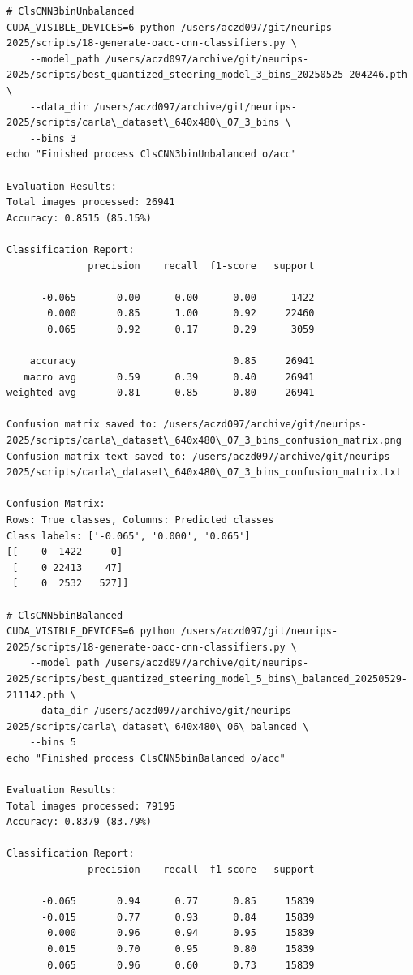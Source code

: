 \begin{verbatim}
# ClsCNN3binUnbalanced
CUDA_VISIBLE_DEVICES=6 python /users/aczd097/git/neurips-2025/scripts/18-generate-oacc-cnn-classifiers.py \
    --model_path /users/aczd097/archive/git/neurips-2025/scripts/best_quantized_steering_model_3_bins_20250525-204246.pth \
    --data_dir /users/aczd097/archive/git/neurips-2025/scripts/carla\_dataset\_640x480\_07_3_bins \
    --bins 3
echo "Finished process ClsCNN3binUnbalanced o/acc"

Evaluation Results:
Total images processed: 26941
Accuracy: 0.8515 (85.15%)

Classification Report:
              precision    recall  f1-score   support

      -0.065       0.00      0.00      0.00      1422
       0.000       0.85      1.00      0.92     22460
       0.065       0.92      0.17      0.29      3059

    accuracy                           0.85     26941
   macro avg       0.59      0.39      0.40     26941
weighted avg       0.81      0.85      0.80     26941

Confusion matrix saved to: /users/aczd097/archive/git/neurips-2025/scripts/carla\_dataset\_640x480\_07_3_bins_confusion_matrix.png
Confusion matrix text saved to: /users/aczd097/archive/git/neurips-2025/scripts/carla\_dataset\_640x480\_07_3_bins_confusion_matrix.txt

Confusion Matrix:
Rows: True classes, Columns: Predicted classes
Class labels: ['-0.065', '0.000', '0.065']
[[    0  1422     0]
 [    0 22413    47]
 [    0  2532   527]]

# ClsCNN5binBalanced
CUDA_VISIBLE_DEVICES=6 python /users/aczd097/git/neurips-2025/scripts/18-generate-oacc-cnn-classifiers.py \
    --model_path /users/aczd097/archive/git/neurips-2025/scripts/best_quantized_steering_model_5_bins\_balanced_20250529-211142.pth \
    --data_dir /users/aczd097/archive/git/neurips-2025/scripts/carla\_dataset\_640x480\_06\_balanced \
    --bins 5
echo "Finished process ClsCNN5binBalanced o/acc"

Evaluation Results:
Total images processed: 79195
Accuracy: 0.8379 (83.79%)

Classification Report:
              precision    recall  f1-score   support

      -0.065       0.94      0.77      0.85     15839
      -0.015       0.77      0.93      0.84     15839
       0.000       0.96      0.94      0.95     15839
       0.015       0.70      0.95      0.80     15839
       0.065       0.96      0.60      0.73     15839


\end{verbatim}
